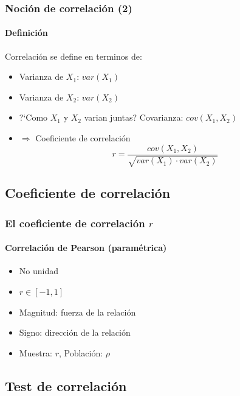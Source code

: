 \documentclass[gray,handout,mathserif]{beamer}
\begin{document}
 
\begin{frame}[label=introcorr2]
   \frametitle{Noci\'on de correlaci\'on (2)}
   \framesubtitle{Definici\'on}

    \begin{beamerboxesrounded}{\alert{Correlaci\'on} se define en terminos de:}
    \begin{itemize}[<+-| handout:1>]
      \item Varianza de $X_1$: $var(X_1) $
      \item Varianza de $X_2$: $var(X_2) $
      \item ?`Como $X_1$ y $X_2$ varian juntas? Covarianza: $cov(X_1, X_2)$
      \bigskip
      \item[] $\Rightarrow$ Coeficiente de correlaci\'on $$r=\frac{cov(X_1, X_2)}{\sqrt{var(X_1)\cdot var(X_2)}}$$
   \end{itemize}
   \end{beamerboxesrounded}
\end{frame}%


\subsection[Coeficiente de correlaci\'on]{Coeficiente de correlaci\'on}
 
\begin{frame}[label=corrcoeff]
   \frametitle{El coeficiente de correlaci\'on $r$}
   \framesubtitle{Correlaci\'on de Pearson (param\'etrica)}
    \begin{itemize}
      \item No unidad
      \item $r \in [-1,1]$
      \item Magnitud: fuerza de la relaci\'on
      \item Signo: direcci\'on de la relaci\'on
      \item Muestra: $r$, Poblaci\'on: $\rho$
   \end{itemize}
\end{frame}%


\subsection[Test]{Test de correlaci\'on}
 
\end{document}

